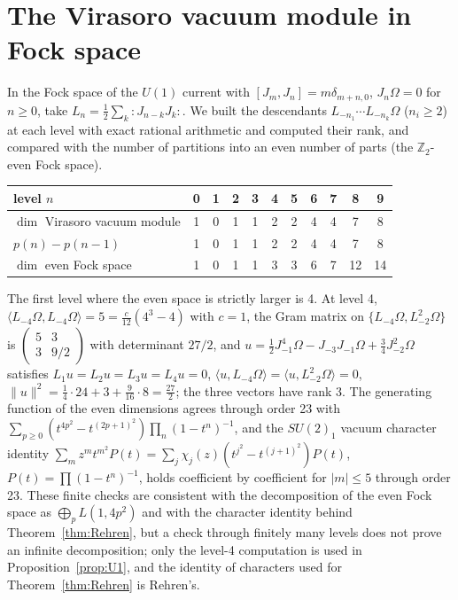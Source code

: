 \documentclass[12pt]{article}
\theoremstyle{definition}
\theoremstyle{remark}
\begin{document}
\section{The Virasoro vacuum module in Fock space}\label{app:fock}

In the Fock space of the \(U(1)\) current with \([J_m,J_n]=m\delta_{m+n,0}\),
\(J_n\Omega=0\) for \(n\ge0\), take \(L_n=\tfrac12\sum_k{:}J_{n-k}J_k{:}\). We built the descendants \(L_{-n_1}\cdots L_{-n_k}\Omega\) (\(n_i\ge2\)) at each level with exact
rational arithmetic and computed their rank, and compared with the number of
partitions into an even number of parts (the \(\mathbb Z_2\)-even Fock space).
\begin{center}
\begin{tabular}{l|cccccccccc}
level \(n\) & 0&1&2&3&4&5&6&7&8&9\\\hline
\(\dim\) Virasoro vacuum module & 1&0&1&1&2&2&4&4&7&8\\
\(p(n)-p(n-1)\) & 1&0&1&1&2&2&4&4&7&8\\
\(\dim\) even Fock space & 1&0&1&1&3&3&6&7&12&14
\end{tabular}
\end{center}
The first level where the even space is strictly larger is 4. At level 4,
\(\langle L_{-4}\Omega,L_{-4}\Omega\rangle=5=\tfrac c{12}(4^3-4)\) with \(c=1\), the Gram
matrix on \(\{L_{-4}\Omega,L_{-2}^2\Omega\}\) is \(\left(\begin{smallmatrix}5&3\\3&9/2\end{smallmatrix}\right)\) with
determinant \(27/2\), and
\(u=\tfrac12J_{-1}^4\Omega-J_{-3}J_{-1}\Omega+\tfrac34J_{-2}^2\Omega\) satisfies
\(L_1u=L_2u=L_3u=L_4u=0\), \(\langle u,L_{-4}\Omega\rangle=\langle u,L_{-2}^2\Omega\rangle=0\),
\(\|u\|^2=\tfrac14\cdot24+3+\tfrac9{16}\cdot8=\tfrac{27}2\); the three vectors have rank
3. The generating function of the even dimensions agrees through order 23 with
\(\sum_{p\ge0}(t^{4p^2}-t^{(2p+1)^2})\prod_n(1-t^n)^{-1}\), and the \(SU(2)_1\) vacuum character
identity \(\sum_mz^mt^{m^2}P(t)=\sum_j\chi_j(z)(t^{j^2}-t^{(j+1)^2})P(t)\), \(P(t)=\prod(1-t^n)^{-1}\),
holds coefficient by coefficient for \(|m|\le5\) through order 23. These finite checks are consistent
with the decomposition of the even Fock space as \(\bigoplus_pL(1,4p^2)\) and with the character
identity behind Theorem~\ref{thm:Rehren}, but a check through finitely many levels does not prove an
infinite decomposition; only the level-4 computation is used in Proposition~\ref{prop:U1}, and the
identity of characters used for Theorem~\ref{thm:Rehren} is Rehren's.
\end{document}
